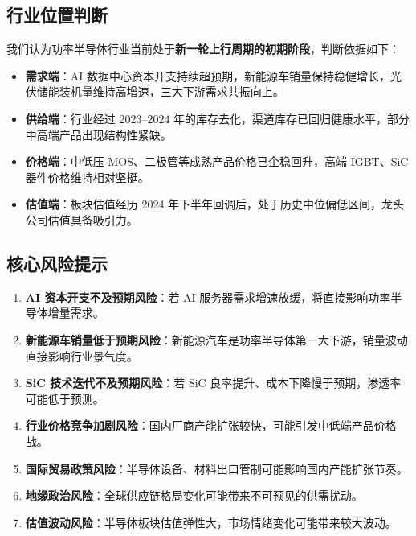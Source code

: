 \subsection{行业位置判断}

我们认为功率半导体行业当前处于\textbf{新一轮上行周期的初期阶段}，判断依据如下：

\begin{itemize}[leftmargin=2em]
\item \textbf{需求端}：AI 数据中心资本开支持续超预期，新能源车销量保持稳健增长，光伏储能装机量维持高增速，三大下游需求共振向上。
\item \textbf{供给端}：行业经过 2023–2024 年的库存去化，渠道库存已回归健康水平，部分中高端产品出现结构性紧缺。
\item \textbf{价格端}：中低压 MOS、二极管等成熟产品价格已企稳回升，高端 IGBT、SiC 器件价格维持相对坚挺。
\item \textbf{估值端}：板块估值经历 2024 年下半年回调后，处于历史中位偏低区间，龙头公司估值具备吸引力。
\end{itemize}

\subsection{核心风险提示}

\begin{riskbox}[核心风险提示]
\begin{enumerate}[leftmargin=2em, topsep=0pt]
\item \textbf{AI 资本开支不及预期风险}：若 AI 服务器需求增速放缓，将直接影响功率半导体增量需求。
\item \textbf{新能源车销量低于预期风险}：新能源汽车是功率半导体第一大下游，销量波动直接影响行业景气度。
\item \textbf{SiC 技术迭代不及预期风险}：若 SiC 良率提升、成本下降慢于预期，渗透率可能低于预测。
\item \textbf{行业价格竞争加剧风险}：国内厂商产能扩张较快，可能引发中低端产品价格战。
\item \textbf{国际贸易政策风险}：半导体设备、材料出口管制可能影响国内产能扩张节奏。
\item \textbf{地缘政治风险}：全球供应链格局变化可能带来不可预见的供需扰动。
\item \textbf{估值波动风险}：半导体板块估值弹性大，市场情绪变化可能带来较大波动。
\end{enumerate}
\end{riskbox}

